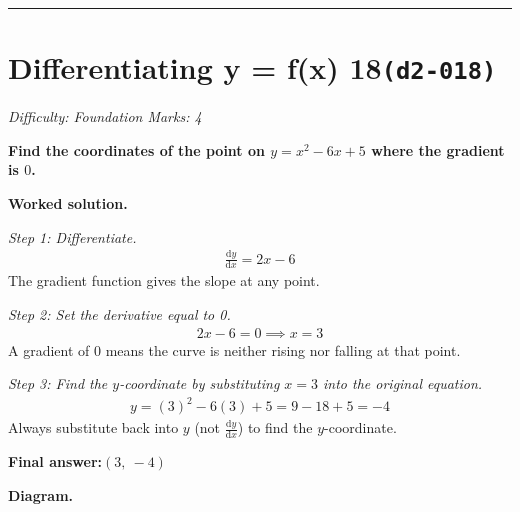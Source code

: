 \documentclass[11pt]{article}
\newcommand{\question}[1]{\par\medskip\noindent\textbf{#1}\par}
\begin{document}
\medskip\hrule

\section*{Differentiating y = f(x) 18\quad\small\texttt{(d2-018)}}
\textit{Difficulty: Foundation \quad\textbar\quad Marks: 4}

\question{Find the coordinates of the point on \( y = x^2 - 6x + 5 \) where the gradient is \( 0 \).}

\textbf{Worked solution.}

\textit{Step 1: Differentiate.}
\[\begin{gathered}
\frac{\mathrm{d}y}{\mathrm{d}x} = 2x - 6
\end{gathered}\]
The gradient function gives the slope at any point.

\textit{Step 2: Set the derivative equal to 0.}
\[\begin{gathered}
2x - 6 = 0 \implies x = 3
\end{gathered}\]
A gradient of 0 means the curve is neither rising nor falling at that point.

\textit{Step 3: Find the \( y \)-coordinate by substituting \( x = 3 \) into the original equation.}
\[\begin{gathered}
y = (3)^2 - 6(3) + 5 = 9 - 18 + 5 = -4
\end{gathered}\]
Always substitute back into \( y \) (not \( \frac{\mathrm{d}y}{\mathrm{d}x} \)) to find the \(y\)-coordinate.

\begin{answerbox}
\textbf{Final answer:}\quad \(\displaystyle  (3,\ -4) \)
\end{answerbox}
\textbf{Diagram.}
\end{document}
